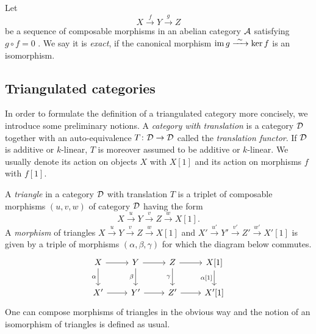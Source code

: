 \begin{definition}
    Let
    \[
        X \xrightarrow{\ f \ } Y \xrightarrow{\ g\ } Z
    \]
    be a sequence of composable morphisms in an abelian category $\mathcal A$ satisfying $g \circ f = 0$ . We say it is \emph{exact}, if the canonical morphism $\operatorname{im} g \xrightarrow{\ \sim \ } \ker f$ is an isomorphism.
\end{definition}

\subsection{Triangulated categories}

In order to formulate the definition of a triangulated category more concisely, we introduce some preliminary notions. A \emph{category with translation} is a category $\mathcal D$ together with an auto-equivalence $T\colon \mathcal D \to \mathcal D$ called the \emph{translation functor}. If $\mathcal D$ is additive or $k$-linear, $T$ is moreover assumed to be additive or $k$-linear. We usually denote its action on objects $X$ with $X[1]$ and its action on morphisms $f$ with $f[1]$.

A \emph{triangle} in a category $\mathcal D$ with translation $T$ is a triplet of composable morphisms $(u, v, w)$ of category $\mathcal D$ having the form 
\[
    X\xrightarrow{\ u \ } Y \xrightarrow{\ v \ } Z \xrightarrow{\ w \ } X[1].
\]
A \emph{morphism} of triangles $X\xrightarrow{u} Y \xrightarrow{v} Z \xrightarrow{w} X[1]$ and $X'\xrightarrow{u'} Y' \xrightarrow{v'} Z' \xrightarrow{w'} X'[1]$ is given by a triple of morphisms $(\alpha, \beta, \gamma)$ for which the diagram below commutes.
\[\begin{tikzcd}
	X & Y & Z & {X[1]} \\
	{X'} & {Y'} & {Z'} & {X'[1]}
	\arrow[from=1-1, to=1-2]
	\arrow["\alpha"', from=1-1, to=2-1]
	\arrow[from=1-2, to=1-3]
	\arrow["\beta"', from=1-2, to=2-2]
	\arrow[from=1-3, to=1-4]
	\arrow["\gamma"', from=1-3, to=2-3]
	\arrow["{\alpha[1]}"', from=1-4, to=2-4]
	\arrow[from=2-1, to=2-2]
	\arrow[from=2-2, to=2-3]
	\arrow[from=2-3, to=2-4]
\end{tikzcd}
\]
One can compose morphisms of triangles in the obvious way and the notion of an isomorphism of triangles is defined as usual.

